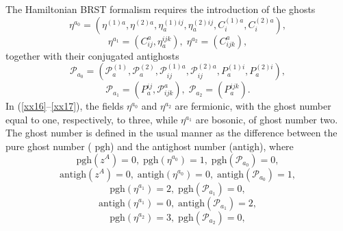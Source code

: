 \documentclass[a4paper,12pt]{article}
\begin{document}
The Hamiltonian BRST formalism requires the introduction of the ghosts 
\begin{equation}
\eta ^{a_{0}}=\left( \eta ^{(1)a},\eta ^{(2)a},\eta _{a}^{(1)ij},\eta
_{a}^{(2)ij},C_{i}^{(1)a},C_{i}^{(2)a}\right) ,  \label{xx16}
\end{equation}
\begin{equation}
\eta ^{a_{1}}=\left( C_{ij}^{a},\eta _{a}^{ijk}\right) ,\;\eta
^{a_{2}}=\left( C_{ijk}^{a}\right) ,  \label{xx17}
\end{equation}
together with their conjugated antighosts 
\begin{equation}
\mathcal{P}_{a_{0}}=\left( \mathcal{P}_{a}^{(1)},\mathcal{P}_{a}^{(2)},%
\mathcal{P}_{ij}^{(1)a},\mathcal{P}_{ij}^{(2)a},P_{a}^{(1)i},P_{a}^{(2)i}%
\right) ,  \label{xx18}
\end{equation}
\begin{equation}
\mathcal{P}_{a_{1}}=\left( P_{a}^{ij},\mathcal{P}_{ijk}^{a}\right) ,\;%
\mathcal{P}_{a_{2}}=\left( P_{a}^{ijk}\right) .  \label{xx19}
\end{equation}
In (\ref{xx16}--\ref{xx17}), the fields $\eta ^{a_{0}}$ and $\eta ^{a_{2}}$
are fermionic, with the ghost number equal to one, respectively, to three,
while $\eta ^{a_{1}}$ are bosonic, of ghost number two. The ghost number is
defined in the usual manner as the difference between the pure ghost number (%
$\mathrm{pgh}$) and the antighost number ($\mathrm{antigh}$), where 
\begin{equation}
\mathrm{pgh}\left( z^{A}\right) =0,\;\mathrm{pgh}\left( \eta ^{a_{0}}\right)
=1,\;\mathrm{pgh}\left( \mathcal{P}_{a_{0}}\right) =0,  \label{xx20}
\end{equation}
\begin{equation}
\mathrm{antigh}\left( z^{A}\right) =0,\;\mathrm{antigh}\left( \eta
^{a_{0}}\right) =0,\;\mathrm{antigh}\left( \mathcal{P}_{a_{0}}\right) =1,
\label{xx21}
\end{equation}
\begin{equation}
\mathrm{pgh}\left( \eta ^{a_{1}}\right) =2,\;\mathrm{pgh}\left( \mathcal{P}%
_{a_{1}}\right) =0,  \label{xx22}
\end{equation}
\begin{equation}
\mathrm{antigh}\left( \eta ^{a_{1}}\right) =0,\;\mathrm{antigh}\left( 
\mathcal{P}_{a_{1}}\right) =2,  \label{xx23}
\end{equation}
\begin{equation}
\mathrm{pgh}\left( \eta ^{a_{2}}\right) =3,\;\mathrm{pgh}\left( \mathcal{P}%
_{a_{2}}\right) =0,  \label{xx24}
\end{equation}
\end{document}
